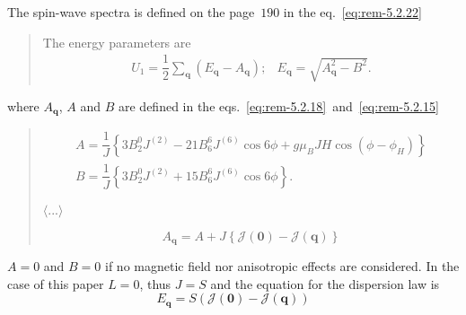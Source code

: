     The spin-wave spectra is defined on the page~$190$ in the eq.~\eqref{eq:rem-5.2.22}
    \begin{quote}
        The energy parameters are
        \begin{equation}
            \begin{matrix}
                U_1 = \dfrac{1}{2}\sum_{\mathbf{q}}(E_{\mathbf{q}} - A_{\mathbf{q}}); & E_{\mathbf{q}} = \sqrt{A_{\mathbf{q}}^2 - B^2}.
            \end{matrix}
            \label{eq:rem-5.2.22} \tag{5.2.22}
        \end{equation}
    \end{quote}
    where $A_{\mathbf{q}}$, $A$ and $B$ are defined in the eqs.~\eqref{eq:rem-5.2.18}~and~\eqref{eq:rem-5.2.15}
    \begin{quote}
        \begin{equation}
            \begin{matrix}
                A = \dfrac{1}{J}\left\{3B^0_2J^{(2)} - 21B^6_6J^{(6)}\cos6\phi + g\mu_BJH\cos(\phi - \phi_H)\right\}\\
                B = \dfrac{1}{J}\left\{3B^0_2J^{(2)} + 15B^6_6J^{(6)}\cos6\phi\right\}.
            \end{matrix}
            \label{eq:rem-5.2.15} \tag{5.2.15}
        \end{equation}

        $\langle ... \rangle$

        
        \begin{equation}
            A_{\mathbf{q}} = A + J\left\{\mathcal{J}(\mathbf{0}) - \mathcal{J}(\mathbf{q})\right\}
            \label{eq:rem-5.2.18} \tag{5.2.18}
        \end{equation}
    \end{quote}
    $A = 0$ and $B = 0$ if no magnetic field nor anisotropic effects are considered. In the case of this paper $L = 0$, thus $J = S$ and the equation for the dispersion law is
    \begin{equation}
        E_{\mathbf{q}} = S\left(\mathcal{J}(\mathbf{0}) - \mathcal{J}(\mathbf{q})\right)
    \end{equation}

